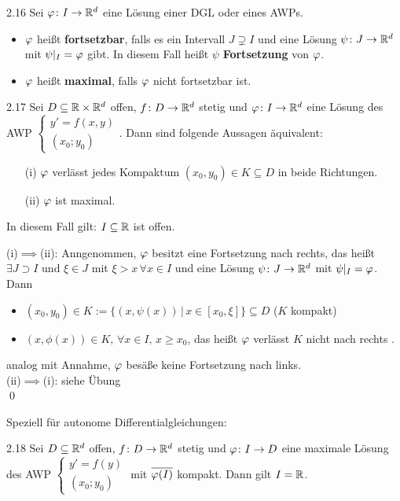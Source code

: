 \documentclass[a4paper]{article}
\begin{document}
\begin{Def}{}{2.16}
Sei $\operatorname{\varphi}\colon I\to\mathbb R^d$ eine Lösung einer DGL oder eines AWPs.
\begin{itemize}
\item $\operatorname{\varphi}$ heißt \textbf{fortsetzbar}, falls es ein Intervall $J\supsetneq I$ und eine Lösung $\psi\colon J\to\mathbb R^d$ mit $\psi|_I=\operatorname{\varphi}$ gibt. In diesem Fall heißt $\psi$ \textbf{Fortsetzung} von $\operatorname{\varphi}$.
\item $\operatorname{\varphi}$ heißt \textbf{maximal}, falls $\operatorname{\varphi}$ nicht fortsetzbar ist.
\end{itemize}
\end{Def}

\begin{Satz}{}{2.17}
Sei $D\subseteq \mathbb R\times \mathbb R^d$ offen, $f\colon D\to\mathbb R^d$ stetig und $\operatorname{\varphi}\colon I\to\mathbb R^d$ eine Lösung des AWP $\left\{ \begin{array}{c}
y'=f(x,y)\\
(x_0;y_0)
\end{array} \right.$. Dann sind folgende Aussagen äquivalent:
\begin{itemize}
\item[(i)] $\operatorname{\varphi}$ verlässt jedes Kompaktum $(x_0,y_0)\in K\subseteq D$ in beide Richtungen.
\item[(ii)] $\operatorname{\varphi}$ ist maximal.
\end{itemize}
In diesem Fall gilt: $I\subseteq\mathbb R$ ist offen.
\end{Satz}

\begin{Beweis}
(i)$\implies$(ii): Anngenommen, $\operatorname{\varphi}$ besitzt eine Fortsetzung nach rechts, das heißt $\exists J\supset I$ und $\xi\in J$ mit $\xi>x\,\forall x\in I$ und eine Lösung $\psi\colon J\to\mathbb R^d$ mit $\psi|_I=\operatorname{\varphi}$. Dann
\begin{itemize}
\item $(x_0,y_0)\in K:=\{(x,\psi(x))\,|\,x\in[x_0,\xi]\}\subseteq D$ ($K$ kompakt)
\item $(x,\phi(x))\in K,\,\forall x\in I,\,x\ge x_0$, das heißt $\operatorname{\varphi}$ verlässt $K$ nicht nach rechts \lightning.
\end{itemize}
analog mit Annahme, $\operatorname{\varphi}$ besäße keine Fortsetzung nach links.\\
(ii)$\implies$(i): siehe Übung\\\qed
\end{Beweis}

Speziell für autonome Differentialgleichungen:
\begin{Kor}{}{2.18}
Sei $D\subseteq \mathbb R^d$ offen, $f\colon D\to\mathbb R^d$ stetig und $\operatorname{\varphi}\colon I\to D$ eine maximale Lösung des AWP $\left\{ \begin{array}{c}
y'=f(y)\\
(x_0;y_0)
\end{array}\right. $ mit $\overline{\operatorname{\varphi}(I)}$ kompakt. Dann gilt $I=\mathbb R$.
\end{Kor}
\end{document}
